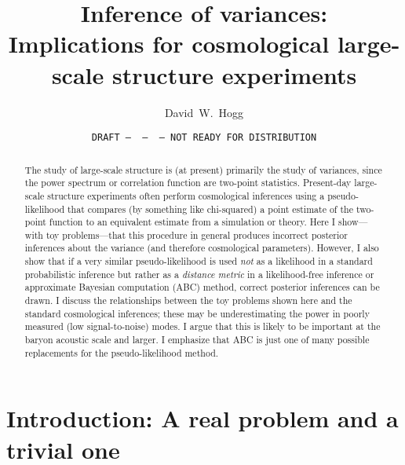 \documentclass[12pt, letterpaper, preprint]{aastex}
\begin{document}
\sloppy\sloppypar\frenchspacing %

\title{Inference of variances:\\
       Implications for cosmological large-scale structure experiments}
\date{\texttt{DRAFT~---~\githash~---~\gitdate~---~NOT READY FOR DISTRIBUTION}}
\author{
  David~W.~Hogg
}

\begin{abstract}
The study of large-scale structure is (at present) primarily the study
of variances, since the power spectrum or correlation function are
two-point statistics.
Present-day large-scale structure experiments often perform
cosmological inferences using a pseudo-likelihood that compares
(by something like chi-squared) a
point estimate of the two-point function to an equivalent estimate
from a simulation or theory.
Here I show---with toy problems---that this procedure in general
produces incorrect posterior inferences about the variance (and
therefore cosmological parameters).
However, I also show that if a very similar pseudo-likelihood
is used
\emph{not} as a likelihood in a standard probabilistic inference but
rather as a \emph{distance metric} in a likelihood-free inference or
approximate Bayesian
computation (ABC) method, correct posterior inferences can be drawn.
I discuss the relationships between the toy problems shown here and
the standard cosmological inferences; these may be underestimating
the power in poorly measured (low signal-to-noise) modes.
I argue that this is likely to be important at the baryon acoustic
scale and larger.
I emphasize that ABC is just one of many possible replacements for
the pseudo-likelihood method.
\end{abstract}


\section{Introduction: A real problem and a trivial one}
\end{document}
